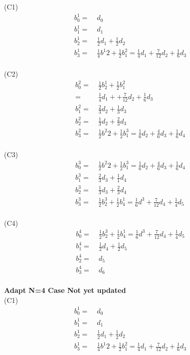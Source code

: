\documentclass[12pt]{article}
\begin{document}
(C1)
\begin{align*}
b^{1}_{0} =&\; d_0 \\
b^{1}_{1} =&\; d_1 \\
b^{1}_{2} =&\; \frac{1}{2} d_1 + \frac{1}{2}d_2 \\
b^{1}_{3} =&\; \frac{1}{4} b^{1}{2} + \frac{1}{2} b^{2}_{1} =\frac{1}{4}d_1 +\frac{7}{12}d_2 + \frac{1}{6}d_3 \\
\end{align*}

(C2)
\begin{align*}
b^{2}_{0} =&\; \frac{1}{2} b^{1}_{2} + \frac{1}{2} b^{2}_{1}\\
=&\; \frac{1}{4} d_1 + +\frac{7}{12}d_2 + \frac{1}{6}d_3 \\
b^{2}_{1} =&\; \frac{2}{3} d_2 + \frac{1}{3}d_3 \\
b^{2}_{2} =&\; \frac{1}{3} d_2 + \frac{2}{3}d_3 \\
b^{2}_{3} =&\; \frac{1}{2} b^{2}{2} + \frac{1}{2} b^{3}_{1} =\frac{1}{6}d_2 +\frac{4}{6}d_3 + \frac{1}{6}d_4 \\
\end{align*}

(C3)
\begin{align*}
b^{3}_{0} =&\; \frac{1}{2} b^{2}{2} + \frac{1}{2} b^{3}_{1} =\frac{1}{6}d_2 +\frac{4}{6}d_3 + \frac{1}{6}d_4 \\
b^{3}_{1} =&\; \frac{2}{3}d_3 + \frac{1}{1} d_4 \\
b^{3}_{2} =&\; \frac{1}{3}d_3 + \frac{2}{3} d_4 \\
b^{3}_{3} =&\; \frac{1}{2} b^{3}_{2} + \frac{1}{2}b^{1}_{4} = \frac{1}{6} d^{3} + \frac{7}{12} d_4 + \frac{1}{4} d_5\\
\end{align*}

(C4)
\begin{align*}
b^{4}_{0} =&\; \frac{1}{2} b^{3}_{2} + \frac{1}{2}b^{1}_{4} = \frac{1}{6} d^{3} + \frac{7}{12} d_4 + \frac{1}{4} d_5\\
b^{4}_{1} =&\; \frac{1}{2}d_4 + \frac{1}{2} d_5 \\
b^{4}_{2} =&\; d_5 \\
b^{4}_{3} =&\; d_6 \\
\end{align*}



\vspace {0.25cm}\noindent
{\bf Adapt N=4 Case Not yet updated} \\

(C1)
\begin{align*}
b^{1}_{0} =&\; d_0 \\
b^{1}_{1} =&\; d_1 \\
b^{1}_{2} =&\; \frac{1}{2} d_1 + \frac{1}{2}d_2 \\
b^{1}_{3} =&\; \frac{1}{4} b^{1}{2} + \frac{1}{2} b^{2}_{1} =\frac{1}{4}d_1 +\frac{7}{12}d_2 + \frac{1}{6}d_3 \\
\end{align*}
\end{document}
